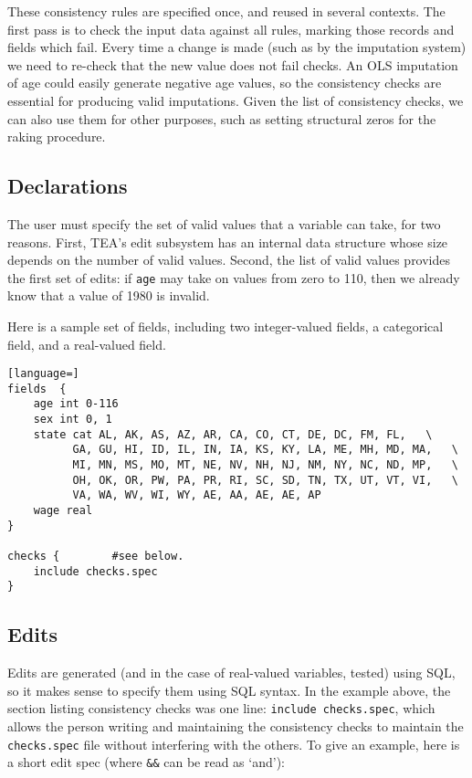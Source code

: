 \documentclass{article}
\begin{document}
These consistency rules are specified once, and reused in several contexts. The first
pass is to check the input data against all rules, marking those records and fields
which fail.  Every time a change is made (such as by the imputation system) we need
to re-check that the new value does not fail checks. An OLS imputation of age could
easily generate negative age values, so the consistency checks are essential for
producing valid imputations. Given the list of consistency checks, we can also use
them for other purposes, such as setting structural zeros for the raking procedure.

\subsection{Declarations}
The user must specify the set of valid values that a variable can take, for two
reasons. First, TEA's edit subsystem has an internal data structure whose size depends
on the number of valid values. Second, the list of valid values provides the first
set of edits: if {\tt age} may take on values from zero to 110, then we already know that a
value of 1980 is invalid.

Here is a sample set of fields, including two integer-valued fields, a categorical
field, and a real-valued field.

\begin{lstlisting}[language=]
fields  {
    age int 0-116
    sex int 0, 1
    state cat AL, AK, AS, AZ, AR, CA, CO, CT, DE, DC, FM, FL,   \
          GA, GU, HI, ID, IL, IN, IA, KS, KY, LA, ME, MH, MD, MA,   \
          MI, MN, MS, MO, MT, NE, NV, NH, NJ, NM, NY, NC, ND, MP,   \
          OH, OK, OR, PW, PA, PR, RI, SC, SD, TN, TX, UT, VT, VI,   \
          VA, WA, WV, WI, WY, AE, AA, AE, AE, AP
    wage real
}

checks {        #see below.
    include checks.spec
}
\end{lstlisting}

\subsection{Edits} 
Edits are generated (and in the case of real-valued variables, tested) using SQL, so
it makes sense to specify them using SQL syntax. In the example above, the section
listing consistency checks was one line: {\tt include checks.spec}, which allows the
person writing and maintaining the consistency checks to maintain the {\tt checks.spec}
file without interfering with the others. To give an example, here is a short edit spec
(where {\tt \&\&} can be read as `and'):
\end{document}
